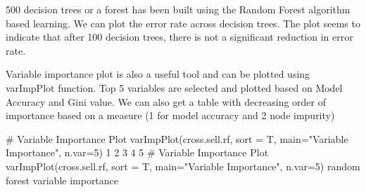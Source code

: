 500 decision trees or a forest has been built using the Random Forest algorithm based learning. We can plot the error rate across decision trees. The plot seems to indicate that after 100 decision trees, there is not a significant reduction in error rate.

Variable importance plot is also a useful tool and can be plotted using varImpPlot function. Top 5 variables are selected and plotted based on Model Accuracy and Gini value. We can also get a table with decreasing order of importance based on a measure (1 for model accuracy and 2 node impurity)


# Variable Importance Plot
varImpPlot(cross.sell.rf,
           sort = T,
           main="Variable Importance",
           n.var=5)
1
2
3
4
5
# Variable Importance Plot
varImpPlot(cross.sell.rf,
           sort = T,
           main="Variable Importance",
           n.var=5)
random forest variable importance


